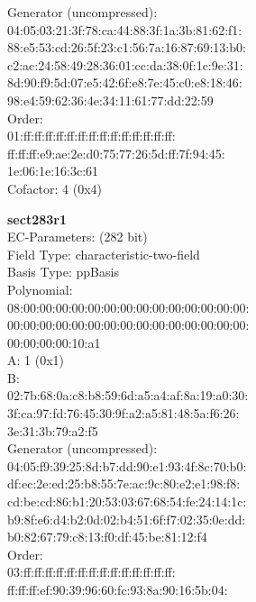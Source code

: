 Generator (uncompressed):\\
    04:05:03:21:3f:78:ca:44:88:3f:1a:3b:81:62:f1:\\
    88:e5:53:cd:26:5f:23:c1:56:7a:16:87:69:13:b0:\\
    c2:ac:24:58:49:28:36:01:cc:da:38:0f:1c:9e:31:\\
    8d:90:f9:5d:07:e5:42:6f:e8:7e:45:c0:e8:18:46:\\
    98:e4:59:62:36:4e:34:11:61:77:dd:22:59\\
Order: \\
    01:ff:ff:ff:ff:ff:ff:ff:ff:ff:ff:ff:ff:ff:ff:\\
    ff:ff:ff:e9:ae:2e:d0:75:77:26:5d:ff:7f:94:45:\\
    1e:06:1e:16:3c:61\\
Cofactor:  4 (0x4)\\
\item \textbf{ sect283r1 }\\
EC-Parameters: (282 bit)\\
Field Type: characteristic-two-field\\
Basis Type: ppBasis\\
Polynomial:\\
    08:00:00:00:00:00:00:00:00:00:00:00:00:00:00:\\
    00:00:00:00:00:00:00:00:00:00:00:00:00:00:00:\\
    00:00:00:00:10:a1\\
A:    1 (0x1)\\
B:   \\
    02:7b:68:0a:c8:b8:59:6d:a5:a4:af:8a:19:a0:30:\\
    3f:ca:97:fd:76:45:30:9f:a2:a5:81:48:5a:f6:26:\\
    3e:31:3b:79:a2:f5\\
Generator (uncompressed):\\
    04:05:f9:39:25:8d:b7:dd:90:e1:93:4f:8c:70:b0:\\
    df:ec:2e:ed:25:b8:55:7e:ac:9c:80:e2:e1:98:f8:\\
    cd:be:cd:86:b1:20:53:03:67:68:54:fe:24:14:1c:\\
    b9:8f:e6:d4:b2:0d:02:b4:51:6f:f7:02:35:0e:dd:\\
    b0:82:67:79:c8:13:f0:df:45:be:81:12:f4\\
Order: \\
    03:ff:ff:ff:ff:ff:ff:ff:ff:ff:ff:ff:ff:ff:ff:\\
    ff:ff:ff:ef:90:39:96:60:fc:93:8a:90:16:5b:04:\\
